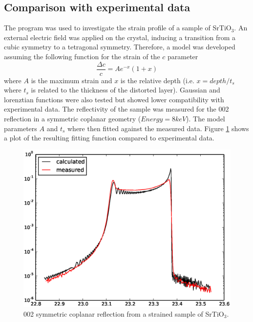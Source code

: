 \documentclass[12pt,oneside,notitlepage,abstracton,a4paper]{scrartcl}
\begin{document}
\subsection{Comparison with experimental data}\label{data}
The program was used to investigate the strain profile of a sample of SrTiO$ _3$. An external electric field was applied on the crystal, inducing a transition from a cubic symmetry to a tetragonal symmetry. Therefore, a model was developed assuming the following function for the strain of the $c$ parameter
\begin{equation}
 \frac{\Delta c}{c}=A e^{-x}(1+x)
\end{equation}
where $A$ is the maximum strain and $x$ is the relative depth (i.e. $x=depth/t_s$ where $t_s$ is related to the thickness of the distorted layer). Gaussian and lorenztian functions were also tested but showed lower compatibility with experimental data.
The reflectivity of the sample was measured for the $002$ reflection in a symmetric coplanar geometry ($Energy=8 keV$).
The model parameters $A$ and $t_s$ where then fitted against the measured data. Figure \ref{SrTiO3_2} shows a plot of the resulting fitting function compared to experimental data.



\begin{figure}[h]
\begin{center}
\includegraphics[width=\textwidth]{pics/SrTiO3_2.eps}
\caption{002 symmetric coplanar reflection from a strained sample of SrTiO$ _3$.}
\label{SrTiO3_2}
\end{center}
\end{figure}
\end{document}

